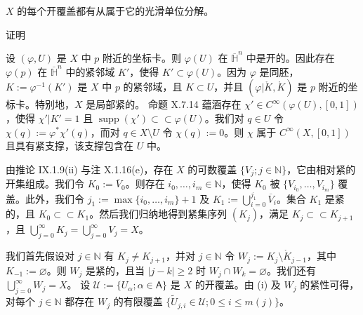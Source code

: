 \begin{proposition}

$ X $ 的每个开覆盖都有从属于它的光滑单位分解。

证明

\begin{subitems}
\item

设 $ (\varphi, U) $ 是 $ X $ 中 $ p $ 附近的坐标卡。则 $ \varphi(U) $ 在 $ \overline{\mathbb{H}}^{n} $ 中是开的。因此存在 $ \varphi(p) $ 在 $ \overline{\mathbb{H}}^{n} $ 中的紧邻域 $ K' $，使得 $ K' \subset \varphi(U) $。因为 $ \varphi $ 是同胚，$ K := \varphi^{-1}(K') $ 是 $ X $ 中 $ p $ 的紧邻域，且 $ K \subset U $，并且 $ (\varphi|\mathring{K}, \mathring{K}) $ 是 $ p $ 附近的坐标卡。特别地，$ X $ 是局部紧的。
命题 X.7.14 蕴涵存在 $ \chi' \in C^{\infty}(\varphi(U), [0, 1]) $，使得 $ \chi'|K' = 1 $ 且 $ \operatorname{supp}(\chi') \subset\subset \varphi(U) $。我们对 $ q \in U $ 令 $ \chi(q) := \varphi^{\ast}\chi'(q) $，而对 $ q \in X \setminus U $ 令 $ \chi(q) := 0 $。则 $ \chi $ 属于 $ C^{\infty}(X, [0, 1]) $ 且具有紧支撑，该支撑包含在 $ U $ 中。

\item

由推论 IX.1.9(ii) 与注 X.1.16(e)，存在 $ X $ 的可数覆盖 $ \{V_{j} ; j \in \mathbb{N}\} $，它由相对紧的开集组成。我们令 $ K_{0} := \overline{V}_{0} $。则存在 $ i_{0}, \ldots, i_{m} \in \mathbb{N} $，使得 $ K_{0} $ 被 $ \{V_{i_{0}}, \ldots, V_{i_{m}}\} $ 覆盖。此外，我们令 $ j_{1} := \max\{i_{0}, \ldots, i_{m}\} + 1 $ 及 $ K_{1} := \bigcup_{i=0}^{j_{1}} \overline{V}_{i} $。集合 $ K_{1} $ 是紧的，且 $ K_{0} \subset\subset K_{1} $。然后我们归纳地得到紧集序列 $ (K_{j}) $，满足 $ K_{j} \subset\subset K_{j+1} $，且 $ \bigcup_{j=0}^{\infty} K_{j} = \bigcup_{j=0}^{\infty} V_{j} = X $。

\item

我们首先假设对 $ j \in \mathbb{N} $ 有 $ K_{j} \ne K_{j+1} $，并对 $ j \in \mathbb{N} $ 令 $ W_{j} := K_{j} \setminus \mathring{K}_{j-1} $，其中 $ K_{-1} := \varnothing $。则 $ W_{j} $ 是紧的，且当 $ |j - k| \ge 2 $ 时 $ W_{j} \cap W_{k} = \varnothing $。我们还有 $ \bigcup_{j=0}^{\infty} W_{j} = X $。
设 $ \mathcal{U} := \{U_{\alpha} ; \alpha \in \mathsf{A}\} $ 是 $ X $ 的开覆盖。由 (i) 及 $ W_{j} $ 的紧性可得，对每个 $ j \in \mathbb{N} $ 都存在 $ W_{j} $ 的有限覆盖 $ \{\widetilde{U}_{j,i} \in \mathcal{U} ; 0 \le i \le m(j)\} $。

\end{subitems}


\end{proposition}
